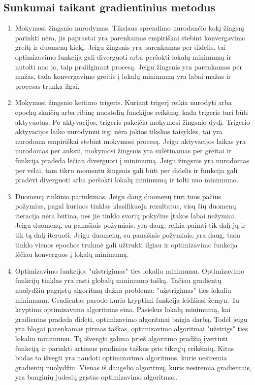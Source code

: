 \documentclass{VUMIFInfKursinis}
\begin{document}
\subsection{Sunkumai taikant gradientinius metodus}
\begin{enumerate}
\item Mokymosi žingsnio nurodymas. Tikslaus sprendimo nurodančio kokį žingsnį parinkti nėra, jis paprastai
yra parenkamas empiriškai stebint konvergavimo greitį ir duomenų kiekį. Jeigu žingsnis yra parenkamas per didelis,
tai optimizavimo funkcija gali diverguoti arba peršokti lokalų minimumą ir nutolti nuo jo, taip praiilginant
procesą. Jeigu žingsnis yra parenkamas per mažas, tada konvergavimo greitis į lokalų minimumą yra labai mažas
ir procesas trunka ilgai.
\item Mokymosi žingsnio keitimo trigeris. Kuriant trigerį reikia nurodyti arba epochų skaičių arba ribinę nuostolių
funckijos reikšmę, kada trigeris turi būti aktyvuotas. Po aktyvacijos, trigeris pakeičia mokymosi žingsnio dydį.
Trigerio aktyvacijos laiko nurodymui irgi nėra jokios tikslios taisyklės, tai yra nurodoma empiriškai stebint
mokymosi procesą. Jeigu aktyvacijos laikas yra nurodomas per anksti, mokymosi žingsnis yra sulėtinamas per greitai
ir funkcija pradeda lėčiau diverguoti į minimumą. Jeigu žingsnis yra nurodomas per vėlai, tam tikru momentu
žingsnis gali būti per didelis ir funkcija gali pradėvi diverguoti arba peršokti lokalų minimumą ir tolti nuo
minimumo.
\item Duomenų rinkinio parinkimas. Jeigu daug duomenų turi tuos pačius požymius, pagal kuriuos tinklas klasifikuoja
rezultatus, visų šių duomenų iteracija nėra būtina, nes jie tinklo svorių pokyčius įtakos labai nežymiai.
Jeigu duomenų, su panašiais požymiais, yra daug, reikia paimti tik dalį jų ir tik tą dalį iteruoti. Jeigu
duomenų, su panašiais požymiais, yra daug, tada tinklo vienos epochos trukmė gali užtrukti ilgiau ir optimizavimo
funkcija lėčiau konverguos į lokalų minimumą.
\item Optimizavimo funkcijos "užstrigimas" ties lokaliu minimumu. Optimizavimo funkcijų tinklas yra rasti
globalų minimumo tašką. Tačiau gradientų nuolydžiu pagrįstų algoritmų dažna problema: "užstrigimas" ties
lokaliu minimumu. Gradientas parodo kuria kryptimi funkcija leidžiasi žemyn. Ta kryptimi optimizavimo algoritmas
eina. Pasiekus lokalų minimumą, kai gradientas pradeda didėti, optimizavimo algoritmai baigia darbą. Todėl jeigu yra
blogai parenkamas pirmas taškas, optimizavimo algoritmai "užstrigs" ties lokaliu minimumu. Tą išvengti galima prieš algoritmo pradžią
įvertinti funkciją ir parinkti artimus pradinius taškus prie tikrųjų reikšmių. Kitas būdas to išvegti yra naudoti
optimizavimo algoritmus, kurie nesiremia gradientų nuolydžiu. Vienas iš daugelio algoritmų, kuris nesiremia gradientais, yra
banginių judesių grįstas optimizavimo algoritmas.
\end{enumerate}
\end{document}
